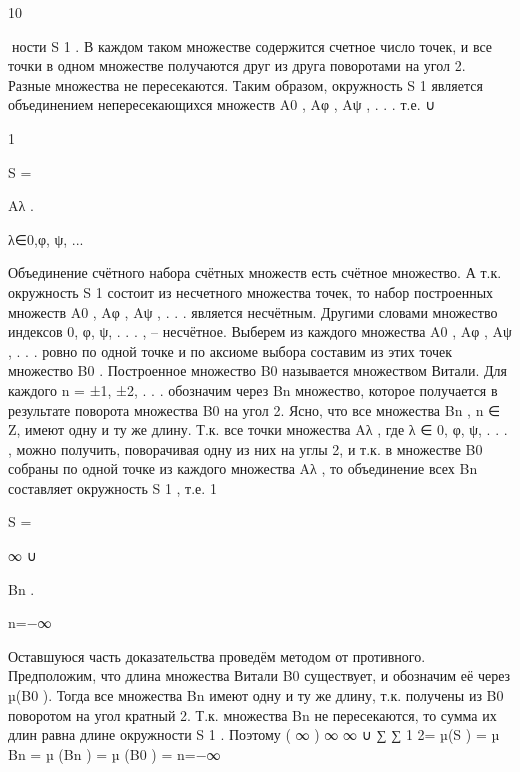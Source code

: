 10

ности S 1 . В каждом таком множестве содержится счетное число точек, и все
точки в одном множестве получаются друг из друга поворотами на угол 2.
Разные множества не пересекаются. Таким образом, окружность S 1 является
объединением непересекающихся множеств A0 , Aφ , Aψ , . . . т.е.
∪

1

S =

Aλ .

λ∈{0,φ, ψ, ... }

Объединение счётного набора счётных множеств есть счётное множество.
А т.к. окружность S 1 состоит из несчетного множества точек, то набор построенных множеств A0 , Aφ , Aψ , . . . является несчётным. Другими словами
множество индексов {0, φ, ψ, . . . , } -- несчётное.
Выберем из каждого множества A0 , Aφ , Aψ , . . . ровно по одной точке и
по аксиоме выбора составим из этих точек множество B0 . Построенное множество B0 называется множеством Витали. Для каждого n = ±1, ±2, . . .
обозначим через Bn множество, которое получается в результате поворота
множества B0 на угол 2. Ясно, что все множества Bn , n ∈ Z, имеют одну
и ту же длину. Т.к. все точки множества Aλ , где λ ∈ {0, φ, ψ, . . . }, можно получить, поворачивая одну из них на углы 2, и т.к. в множестве B0
собраны по одной точке из каждого множества Aλ , то объединение всех Bn
составляет окружность S 1 , т.е.
1

S =

∞
∪

Bn .

n=−∞

Оставшуюся часть доказательства проведём методом от противного. Предположим, что длина множества Витали B0 существует, и обозначим её через µ(B0 ). Тогда все множества Bn имеют одну и ту же длину, т.к. получены
из B0 поворотом на угол кратный 2. Т.к. множества Bn не пересекаются,
то сумма их длин равна длине окружности S 1 . Поэтому
( ∞
)
∞
∞
∪
∑
∑
1
2\pi = µ(S ) = µ
Bn =
µ (Bn ) =
µ (B0 ) =
n=−∞

